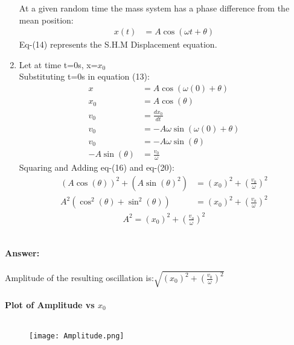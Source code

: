 \documentclass[journal,12pt,twocolumn]{IEEEtran}
\theoremstyle{remark}
\begin{document}
\begin{enumerate}
At a given random time the mass system has a phase difference from the mean position:
\begin{align}
    x(t)&=A\cos(\omega{t}+\theta)
\end{align}
Eq-(14) represents the S.H.M Displacement equation.
\item{}
Let at time t=0s, x=$x_0$\\
Substituting t=0s in equation (13):
\begin{align}
x&=A\cos(\omega{(0)}+\theta{})\\
x_0&=A\cos(\theta{})\\
v_0&=\frac{dx_0}{dt}\\
v_0&=-A\omega{}\sin(\omega{(0)}+\theta{})\\
v_0&=-A\omega{}\sin(\theta{})\\
-A\sin(\theta{})&=\frac{v_0}{\omega{}}
\end{align}
Squaring and Adding eq-(16) and eq-(20):\\
\begin{align}
(A\cos(\theta{}))^2+(A\sin(\theta{})^2)
&=(x_0)^2+\left(\frac{v_0}{\omega{}}\right)^2\\
A^2(\cos^2(\theta{})+\sin^2(\theta{}))
&=(x_0)^2+\left(\frac{v_o}{\omega{}}\right)^2\end{align}
\begin{align}
A^2=(x_0)^2+(\frac{v_o}{\omega{}})^2
\end{align}
\end{enumerate}\\
\textbf{Answer:}\\ \\
Amplitude of the resulting oscillation is:$\sqrt{(x_0)^2+(\frac{v_0}{\omega{}})^2}$\\ \\
\textbf{Plot of Amplitude vs $x_0$}\\ \\
\begin{figure}[h]
        \centering
\texttt{[image: Amplitude.png]}
    \end{figure}
\end{document}
